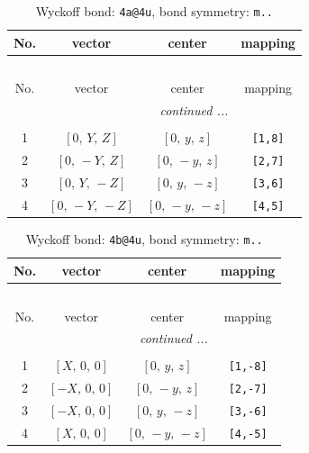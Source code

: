 \documentclass[fleqn,8pt]{jsarticle}
\begin{document}
\begin{longtable}{cccc}
\caption{Wyckoff bond: {\tt 4a@4u}, bond symmetry: {\tt m..}}
 \\
 \hline \hline
No. & vector & center & mapping \\ \hline \endfirsthead

\multicolumn{3}{l}{\tablename\ \thetable{}} \\
 \hline \hline
No. & vector & center & mapping \\ \hline \endhead

 \hline \hline
\multicolumn{3}{r}{\footnotesize\it continued ...} \\ \endfoot

 \hline \hline
\multicolumn{3}{r}{} \\ \endlastfoot

1 & $\left[ 0,\, Y,\, Z \right]$ & $\left[ 0,\, y,\, z \right]$ & {\tt [1,8]} \\ \hline
2 & $\left[ 0,\, - Y,\, Z \right]$ & $\left[ 0,\, - y,\, z \right]$ & {\tt [2,7]} \\ \hline
3 & $\left[ 0,\, Y,\, - Z \right]$ & $\left[ 0,\, y,\, - z \right]$ & {\tt [3,6]} \\ \hline
4 & $\left[ 0,\, - Y,\, - Z \right]$ & $\left[ 0,\, - y,\, - z \right]$ & {\tt [4,5]} \\
\end{longtable}
\renewcommand{\arraystretch}{1.2}
\begin{longtable}{cccc}
\caption{Wyckoff bond: {\tt 4b@4u}, bond symmetry: {\tt m..}}
 \\
 \hline \hline
No. & vector & center & mapping \\ \hline \endfirsthead

\multicolumn{3}{l}{\tablename\ \thetable{}} \\
 \hline \hline
No. & vector & center & mapping \\ \hline \endhead

 \hline \hline
\multicolumn{3}{r}{\footnotesize\it continued ...} \\ \endfoot

 \hline \hline
\multicolumn{3}{r}{} \\ \endlastfoot

1 & $\left[ X,\, 0,\, 0 \right]$ & $\left[ 0,\, y,\, z \right]$ & {\tt [1,-8]} \\ \hline
2 & $\left[ - X,\, 0,\, 0 \right]$ & $\left[ 0,\, - y,\, z \right]$ & {\tt [2,-7]} \\ \hline
3 & $\left[ - X,\, 0,\, 0 \right]$ & $\left[ 0,\, y,\, - z \right]$ & {\tt [3,-6]} \\ \hline
4 & $\left[ X,\, 0,\, 0 \right]$ & $\left[ 0,\, - y,\, - z \right]$ & {\tt [4,-5]} \\
\end{longtable}
\end{document}
